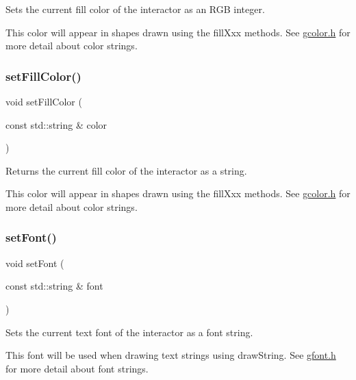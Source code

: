 Sets the current fill color of the interactor as an R\+GB integer. 

This color will appear in shapes drawn using the fill\+Xxx methods. See \mbox{\hyperlink{gcolor_8h_source}{gcolor.\+h}} for more detail about color strings. \mbox{\label{classGDrawingSurface_adbc18b1a930aadd97d7437f9f7265b96}} 
\subsubsection{\texorpdfstring{set\+Fill\+Color()}{setFillColor()}\hspace{0.1cm}{\footnotesize\ttfamily [2/2]}}
{\footnotesize\ttfamily void set\+Fill\+Color (\begin{DoxyParamCaption}\item[{const std\+::string \&}]{color }\end{DoxyParamCaption})\hspace{0.3cm}{\ttfamily [virtual]}}



Returns the current fill color of the interactor as a string. 

This color will appear in shapes drawn using the fill\+Xxx methods. See \mbox{\hyperlink{gcolor_8h_source}{gcolor.\+h}} for more detail about color strings. \mbox{\label{classGDrawingSurface_a8e096e8818d838aceae1d46d58fb3a7b}} 
\subsubsection{\texorpdfstring{set\+Font()}{setFont()}}
{\footnotesize\ttfamily void set\+Font (\begin{DoxyParamCaption}\item[{const std\+::string \&}]{font }\end{DoxyParamCaption})\hspace{0.3cm}{\ttfamily [virtual]}}



Sets the current text font of the interactor as a font string. 

This font will be used when drawing text strings using draw\+String. See \mbox{\hyperlink{gfont_8h_source}{gfont.\+h}} for more detail about font strings. 

